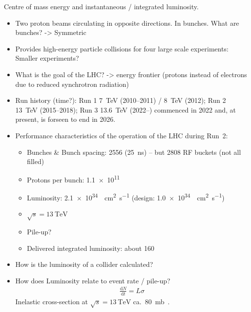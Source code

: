 Centre of mass energy and instantaneous / integrated luminosity.



\begin{itemize}
\item Two proton beams circulating in opposite directions. In bunches. What are
  bunches? -> Symmetric

\item Provides high-energy particle collisions for four large scale experiments:
  Smaller experiments?

\item What is the goal of the LHC? -> energy frontier (protons instead of
  electrons due to reduced synchrotron radiation)

\item Run history (time?): Run 1 \SI{7}{\TeV} (2010--2011) / \SI{8}{\TeV}
  (2012); Run 2 \SI{13}{\TeV} (2015--2018); Run 3 \SI{13.6}{\TeV} (2022--)
  commenced in 2022 and, at present, is forseen to end in 2026.

\item Performance characteristics of the \pp operation of the LHC during Run~2:

  \begin{itemize}
  \item Bunches \& Bunch spacing: 2556 (\SI{25}{\nano\second}) -- but 2808 RF
    buckets (not all filled)
  \item Protons per bunch: \num{1.1e11}
  \item Luminosity: \SI{2.1e34}{\per\centi\metre\squared\per\second} (design:
    \SI{1.0e34}{\per\centi\metre\squared\per\second})
  \item $\sqrt{s} = \SI{13}{\TeV}$
  \item Pile-up?
  \item Delivered integrated luminosity: about \SI{160}{\ifb}
    \end{itemize}

\item How is the luminosity of a collider calculated?

\item How does Luminosity relate to event rate / pile-up?
  \begin{align*}
    \frac{\mathrm{d}N}{\mathrm{d}t} = L \sigma
  \end{align*}
  Inelastic \pp cross-section at $\sqrt{s} = \SI{13}{\TeV}$ ca.\
  \SI{80}{\milli\barn}~\cite{STDM-2015-05}.

\end{itemize}

